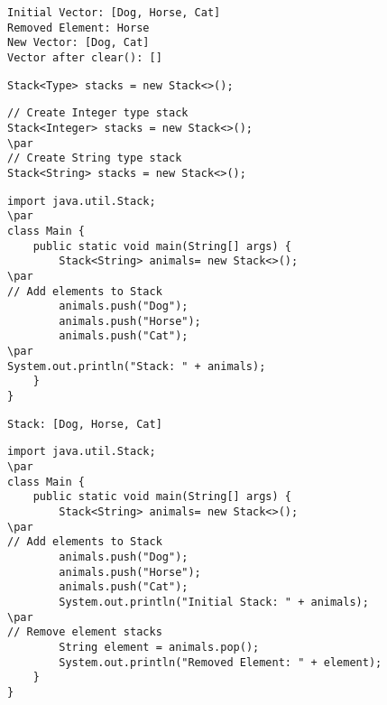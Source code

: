\documentclass{book}
\def\lthtmlcheckvsize{\ifdim\ht\sizebox<\vsize 
  \ifdim\wd\sizebox<\hsize\expandafter\hfill\fi \expandafter\vfill
  \else\expandafter\vss\fi}%
\begin{document}
{\newpage\clearpage
{}%
\begin{lstlisting}
Initial Vector: [Dog, Horse, Cat]
Removed Element: Horse
New Vector: [Dog, Cat]
Vector after clear(): []
\end{lstlisting}%
\lthtmlfigureZ
\lthtmlcheckvsize\clearpage}

{\newpage\clearpage
{}%
\begin{lstlisting}
Stack<Type> stacks = new Stack<>();
\end{lstlisting}%
\lthtmlfigureZ
\lthtmlcheckvsize\clearpage}

{\newpage\clearpage
{}%
\begin{lstlisting}
// Create Integer type stack
Stack<Integer> stacks = new Stack<>();
\par
// Create String type stack
Stack<String> stacks = new Stack<>();
\end{lstlisting}%
\lthtmlfigureZ
\lthtmlcheckvsize\clearpage}

{\newpage\clearpage
{}%
\begin{lstlisting}
import java.util.Stack;
\par
class Main {
    public static void main(String[] args) {
        Stack<String> animals= new Stack<>();
\par
// Add elements to Stack
        animals.push("Dog");
        animals.push("Horse");
        animals.push("Cat");
\par
System.out.println("Stack: " + animals);
    }
}
\end{lstlisting}%
\lthtmlfigureZ
\lthtmlcheckvsize\clearpage}

{\newpage\clearpage
{}%
\begin{lstlisting}
Stack: [Dog, Horse, Cat]
\end{lstlisting}%
\lthtmlfigureZ
\lthtmlcheckvsize\clearpage}

{\newpage\clearpage
{}%
\begin{lstlisting}
import java.util.Stack;
\par
class Main {
    public static void main(String[] args) {
        Stack<String> animals= new Stack<>();
\par
// Add elements to Stack
        animals.push("Dog");
        animals.push("Horse");
        animals.push("Cat");
        System.out.println("Initial Stack: " + animals);
\par
// Remove element stacks
        String element = animals.pop();
        System.out.println("Removed Element: " + element);
    }
}
\end{lstlisting}%
\lthtmlfigureZ
\lthtmlcheckvsize\clearpage}
\end{document}
